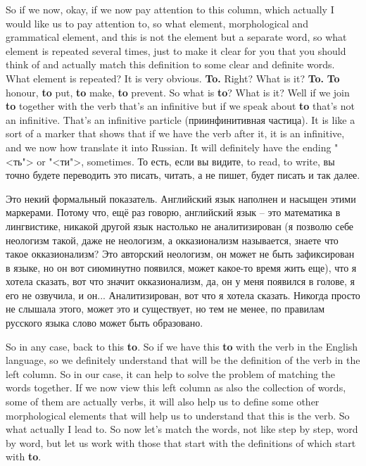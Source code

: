 \documentclass[main.tex]{subfiles}
\begin{document}
So if we now, okay, if we now pay attention to this column, which actually I would like us to pay attention to, so what element, morphological and grammatical element, and this is not the element but a separate word, so what element is repeated several times, just to make it clear for you that you should think of and actually match this definition to some clear and definite words.
What element is repeated? It is very obvious.
\textbf{To.}
Right? What is it? \textbf{To.}
\textbf{To} honour, \textbf{to} put, \textbf{to} make, \textbf{to} prevent.
So what is \textbf{to}?
What is it?
Well if we join \textbf{to} together with the verb that's an infinitive but if we speak about \textbf{to} that's not an infinitive.
That's an infinitive particle (приинфинитивная частица).
It is like a sort of a marker that shows that if we have the verb after it, it is an infinitive, and we now how translate it into Russian.
It will definitely have the ending "<ть"> or "<ти">, sometimes.
То есть, если вы видите, to read, to write, вы точно будете переводить это писать, читать, а не пишет, будет писать и так далее.

Это некий формальный показатель.
Английский язык наполнен и насыщен этими маркерами.
Потому что, ещё раз говорю, английский язык -- это математика в лингвистике, никакой другой язык настолько не аналитизирован (я позволю себе неологизм такой, даже не неологизм, а окказионализм называется, знаете что такое окказионализм? Это авторский неологизм, он может не быть зафиксирован в языке, но он вот сиюминутно появился, может какое-то время жить еще), что я хотела сказать, вот что значит окказионализм, да, он у меня появился в голове, я его не озвучила, и он...
Аналитизирован, вот что я хотела сказать.
Никогда просто не слышала этого, может это и существует, но тем не менее, по правилам русского языка слово может быть образовано.

So in any case, back to this \textbf{to}. 
So if we have this \textbf{to} with the verb in the English language, so we definitely understand that will be the definition of the verb in the left column.
So in our case, it can help to solve the problem of matching the words together.
If we now view this left column as also the collection of words, some of them are actually verbs, it will also help us to define some other morphological elements that will help us to understand that this is the verb.
So what actually I lead to.
So now let's match the words, not like step by step, word by word, but let us work with those that start with the definitions of which start with \textbf{to}.
\end{document}
